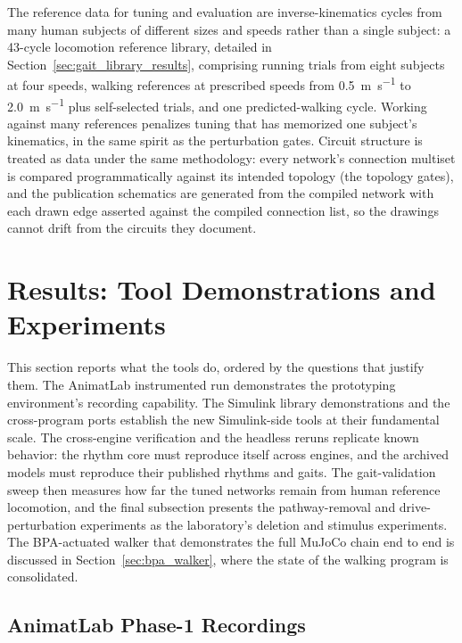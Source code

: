 The reference data for tuning and evaluation are inverse-kinematics cycles from many human subjects of different sizes and speeds rather than a single subject: a 43-cycle locomotion reference library, detailed in Section~\ref{sec:gait_library_results}, comprising running trials from eight subjects at four speeds, walking references at prescribed speeds from \qty{0.5}{\metre\per\second} to \qty{2.0}{\metre\per\second} plus self-selected trials, and one predicted-walking cycle. Working against many references penalizes tuning that has memorized one subject's kinematics, in the same spirit as the perturbation gates. Circuit structure is treated as data under the same methodology: every network's connection multiset is compared programmatically against its intended topology (the topology gates), and the publication schematics are generated from the compiled network with each drawn edge asserted against the compiled connection list, so the drawings cannot drift from the circuits they document.

\section{Results: Tool Demonstrations and Experiments}\label{sec:preliminary_sim_results}

This section reports what the tools do, ordered by the questions that justify them. The AnimatLab instrumented run demonstrates the prototyping environment's recording capability. The Simulink library demonstrations and the cross-program ports establish the new Simulink-side tools at their fundamental scale. The cross-engine verification and the headless reruns replicate known behavior: the rhythm core must reproduce itself across engines, and the archived models must reproduce their published rhythms and gaits. The gait-validation sweep then measures how far the tuned networks remain from human reference locomotion, and the final subsection presents the pathway-removal and drive-perturbation experiments as the laboratory's deletion and stimulus experiments. The BPA-actuated walker that demonstrates the full MuJoCo chain end to end is discussed in Section~\ref{sec:bpa_walker}, where the state of the walking program is consolidated.

\subsection{AnimatLab Phase-1 Recordings}

